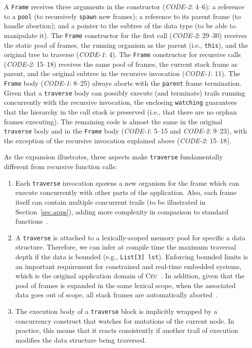 \documentclass{sig-alternate}
\newcommand{\CEU}{\textsc{C\'{e}u}\xspace}
\newcommand{\code}[1] {{\small{\texttt{#1}}}}
\begin{document}
A \code{Frame} receives three arguments in the constructor (\emph{CODE-2}: 
4--6):
a reference to a \code{pool} (to recursively \code{spawn} new frames);
a reference to its parent frame (to handle abortion);
and a pointer to the subtree of the data type (to be able to manipulate it).
%
The \code{Frame} constructor for the first call (\emph{CODE-2}: 29--30) 
receives the static pool of frames, the running organism as the parent (i.e., 
\code{this}), and the original tree to traverse (\emph{CODE-1}: 4).
%
The \code{Frame} constructor for recursive calls (\emph{CODE-2}: 15--18) 
receives the same pool of frames, the current stack frame as parent, and the 
original subtree in the recursive invocation (\emph{CODE-1}: 11).
%
The \code{Frame} body (\emph{CODE-1}: 8--25) always aborts with the
\code{parent} frame termination.
Given that a \code{traverse} body can possibly execute (and terminate) trails 
running concurrently with the recursive invocation, the enclosing 
\code{watching} guarantees that the hierarchy in the call stack is preserved 
(i.e., that there are no orphan frames executing).
%
The remaining code is almost the same in the original \code{traverse} body and 
in the \code{Frame} body (\emph{CODE-1}: 5--15 and \emph{CODE-2}: 9--23), with 
the exception of the recursive invocation explained above (\emph{CODE-2}: 
15--18).

As the expansion illustrates, three aspects make \code{traverse} fundamentally 
different from recursive function calls:
%
\begin{enumerate}
\item Each \code{traverse} invocation spawns a new organism for the frame which 
can execute concurrently with other parts of the application.
Also, each frame itself can contain multiple concurrent trails (to be 
illustrated in Section~\ref{sec.apps}), adding more complexity in comparison to 
standard functions~\cite{ceu.mod15}.
%
\item A \code{traverse} is attached to a lexically-scoped memory pool for 
specific a data structure.
Therefore, we can infer at compile time the maximum traversal depth if the data 
is bounded (e.g., \code{List[3] lst}).
Enforcing bounded limits is an important requirement for constrained and 
real-time embedded systems, which is the original application domain of 
\CEU~\cite{ceu.sensys13}.
In addition, given that the pool of frames is expanded in the same lexical 
scope, when the associated data goes out of scope, all stack frames are 
automatically aborted~\cite{ceu.mod15}.
%
\item The execution body of a \code{traverse} block is implicitly wrapped by a 
concurrency construct that watches for mutations of the current node.
In practice, this means that it reacts consistently if another trail of 
execution modifies the data structure being traversed.
\end{enumerate}
\end{document}
